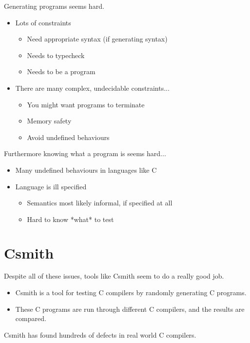 \documentclass{beamer}
\begin{document}
\begin{frame}

  Generating programs seems hard.

  \begin{itemize}
  \item Lots of constraints
    \begin{itemize}
    \item Need appropriate syntax (if generating syntax)
    \item Needs to typecheck
    \item Needs to be a program
    \end{itemize}
  \item There are many complex, undecidable constraints...
    \begin{itemize}
    \item You might want programs to terminate
    \item Memory safety
    \item Avoid undefined behaviours
    \end{itemize}
  \end{itemize}
\end{frame}

\begin{frame}
  Furthermore knowing what a program is seems hard...

  \begin{itemize}
  \item Many undefined behaviours in languages like C
  \item Language is ill specified
    \begin{itemize}
    \item Semantics most likely informal, if specified at all
    \item Hard to know *what* to test
    \end{itemize}
  \end{itemize}
\end{frame}

\section{Csmith}

\begin{frame}

  Despite all of these issues, tools like Csmith seem to do a really
  good job.

  \begin{itemize}
  \item Csmith is a tool for testing C compilers by randomly
    generating C programs.
  \item These C programs are run through different C compilers, and
    the results are compared.
  \end{itemize}

  Csmith has found hundreds of defects in real world C compilers.
\end{frame}
\end{document}
